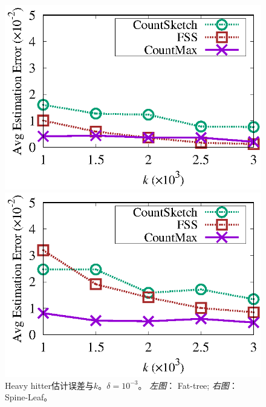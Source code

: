 \begin{figure}[!t]
	\centering
	\begin{minipage}[t]{0.49\linewidth}
		\centering
		\includegraphics[width=\linewidth]{fig/ft_k_hh_10000.eps}
	\end{minipage}\vspace{-0.6em}%
	\begin{minipage}[t]{0.49\linewidth}
		\centering
		\includegraphics[width=\linewidth]{fig/hy_k_hh_10000.eps}
	\end{minipage}\vspace{-0.6em}%
	\caption{\textnormal{Heavy hitter估计误差与$k$。$\delta=10^{-3}$。 \textit{左图}： Fat-tree; \textit{右图}： Spine-Leaf。}}
	\label{fig:hh,k,10000}
\end{figure}

